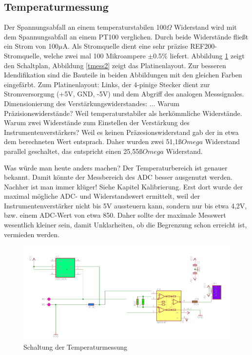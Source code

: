 \documentclass[a4paper,bibtotoc,oneside]{scrbook}
\begin{document}
\subsection{Temperaturmessung}\thispagestyle{empty}
Der Spannungsabfall an einem temperaturstabilen 100$\Omega$ Widerstand wird mit dem Spannungsabfall an einem PT100 verglichen. Durch beide Widerstände fließt ein Strom von 100$\mu$A. Als Stromquelle dient eine sehr präzise REF200-Stromquelle\cite{ref200}, welche zwei mal 100 Mikroampere $\pm$0.5$\%$ liefert. Abbildung \ref{tmess} zeigt den Schaltplan, Abbildung \ref{tmess2} zeigt das Platinenlayout. Zur besseren Idendifikation sind die Bauteile in beiden Abbildungen mit den gleichen Farben eingefärbt. 
Zum Platinenlayout: Links, der 4-pinige Stecker dient zur Stromversorgung (+5V, GND, -5V) und dem Abgriff des analogen Messsignales. Dimensionierung des Verstärkungswiderstandes: ...
Warum Präzisionswiderstände? Weil temperaturstabiler als herkömmliche Widerstände. 
Warum zwei Widerstände zum Einstellen der Verstärkung des Instrumentenverstärkers? Weil es keinen Präzesionswiderstand gab der in etwa dem berechneten Wert entsprach. Daher wurden zwei 51,1$ßOmega$ Widerstand parallel geschaltet, das entspricht einen 25,55$ßOmega$ Widerstand.


Was würde man heute anders machen? Der Temperaturbereich ist genauer bekannt. Damit könnte der Messbereich des ADC besser ausgenutzt werden. Nachher ist man immer klüger! Siehe Kapitel Kalibrierung. Erst dort wurde der maximal mögliche ADC- und Widerstandswert ermittelt, weil der Instrumentenverstärker nicht bis 5V aussteuern kann, sondern nur bis etwa 4,2V, bzw. einem ADC-Wert von etwa 850. Daher sollte der maximale Messwert wesentlich kleiner sein, damit Unklarheiten, ob die Begrenzung schon erreicht ist, vermieden werden. 


\begin{figure}[htbp]
\centering
\includegraphics[width=125mm]{img/tmess.png}
\caption{Schaltung der Temperaturmessung}\label{tmess}
\end{figure}
\end{document}
